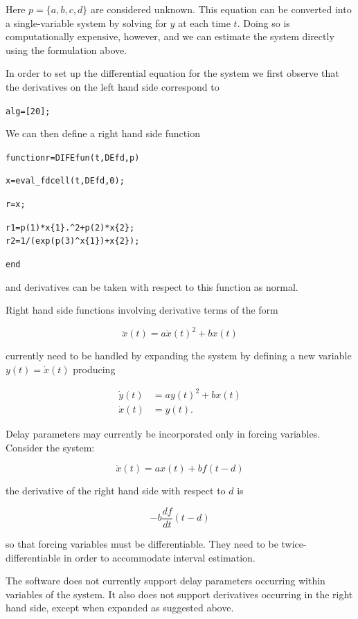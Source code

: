 \documentclass{article}
\newcommand{\nt}    {\noindent}
\begin{document}
Here $p = \{a,b,c,d\}$ are considered unknown. This equation can be converted into a
single-variable system by solving for $y$ at each time $t$. Doing so is computationally expensive,
however, and we can estimate the system directly using the formulation above.

In order to set up the differential equation for the system
we first observe that the derivatives on the left hand side
correspond to

\begin{alltt}
   alg = [2 0];
\end{alltt}

\nt We can then define a right hand side function

\begin{alltt}
   function r = DIFEfun(t,DEfd,p)

   x = eval_fdcell(t,DEfd,0);

   r = x;

   r{1} = p(1)*x\{1\}.^2 + p(2)*x\{2\};
   r{2} = 1/(exp(p(3)^x\{1\})+x\{2\});

   end
\end{alltt}

\nt and derivatives can be taken with respect to this
function as normal.

Right hand side functions involving derivative terms of the
form

\[ \ddot{x}(t) = a \dot{x}(t)^2 + bx(t) \]

\nt currently need to be handled by expanding the system by
defining a new variable $y(t) = \dot{x}(t)$ producing

\begin{align*}
    \dot{y}(t) & = a y(t)^2 + b x(t) \\
    \dot{x}(t) & = y(t).
\end{align*}

Delay parameters may currently be incorporated only in forcing variables. Consider the system:

\[ \dot{x}(t) = a x(t) + bf(t-d) \]

\nt the derivative of the right hand side with respect to $d$ is

\[ -b\frac{df}{dt}(t-d) \]

\nt so that forcing variables must be differentiable. They need to be twice-differentiable in order
to accommodate interval estimation.

The software does not currently support delay parameters occurring within variables of the system.
It also does not support derivatives occurring in the right hand side, except when expanded as
suggested above.
\end{document}
